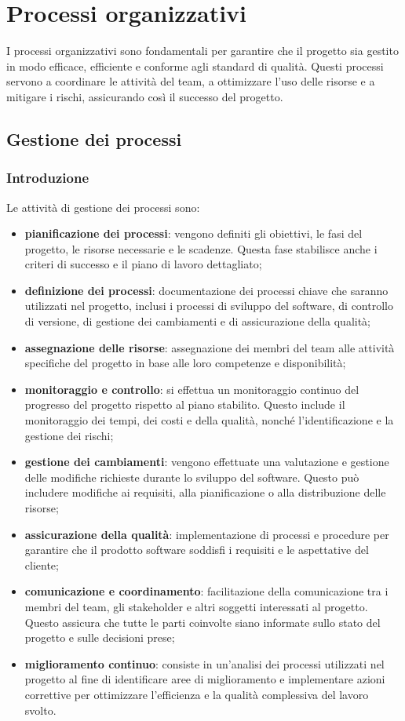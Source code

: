 \section{Processi organizzativi}
I processi organizzativi sono fondamentali per garantire che il progetto sia gestito in modo efficace, efficiente e conforme agli standard di qualità. Questi processi servono a coordinare le attività del team, a ottimizzare l'uso delle risorse e a mitigare i rischi, assicurando così il successo del progetto. 
\subsection{Gestione dei processi}
\subsubsection{Introduzione}
Le attività di gestione dei processi sono:
\begin{itemize}
    \item \textbf{pianificazione dei processi}: vengono definiti gli obiettivi, le fasi del progetto, le risorse necessarie e le scadenze. Questa fase stabilisce anche i criteri di successo e il piano di lavoro dettagliato;
    \item \textbf{definizione dei processi}: documentazione dei processi chiave che saranno utilizzati nel progetto, inclusi i processi di sviluppo del software, di controllo di versione, di gestione dei cambiamenti e di assicurazione della qualità;
    \item \textbf{assegnazione delle risorse}: assegnazione dei membri del team alle attività specifiche del progetto in base alle loro competenze e disponibilità;
    \item \textbf{monitoraggio e controllo}: si effettua un monitoraggio continuo del progresso del progetto rispetto al piano stabilito. Questo include il monitoraggio dei tempi, dei costi e della qualità, nonché l'identificazione e la gestione dei rischi;
    \item \textbf{gestione dei cambiamenti}: vengono effettuate una valutazione e gestione delle modifiche richieste durante lo sviluppo del software. Questo può includere modifiche ai requisiti, alla pianificazione o alla distribuzione delle risorse;
    \item \textbf{assicurazione della qualità}: implementazione di processi e procedure per garantire che il prodotto software soddisfi i requisiti e le aspettative del cliente;
    \item \textbf{comunicazione e coordinamento}: facilitazione della comunicazione tra i membri del team, gli stakeholder e altri soggetti interessati al progetto. Questo assicura che tutte le parti coinvolte siano informate sullo stato del progetto e sulle decisioni prese;
    \item \textbf{miglioramento continuo}: consiste in un'analisi dei processi utilizzati nel progetto al fine di identificare aree di miglioramento e implementare azioni correttive per ottimizzare l'efficienza e la qualità complessiva del lavoro svolto.
\end{itemize}
